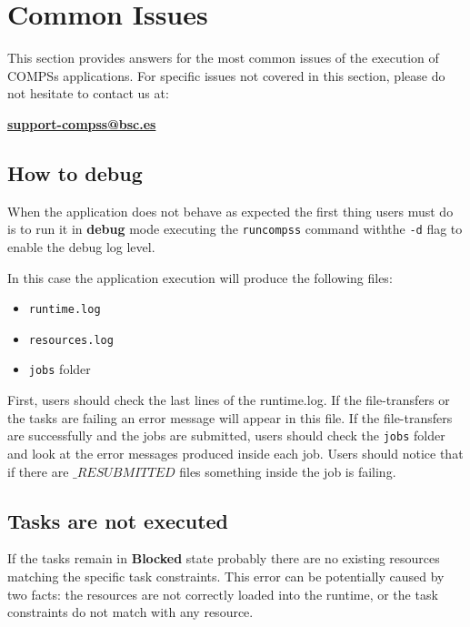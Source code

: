 \section{Common Issues}
\label{sec:Common_Issues}

This section provides answers for the most common issues of the execution of COMPSs applications.
For specific issues not covered in this section, please do not hesitate to contact us at:

\begin{center}
  \textbf{\url{support-compss@bsc.es}}
\end{center}


%
%
\subsection{How to debug}

When the application does not behave as expected the first thing users must do is to run it in \textbf{debug} mode executing
the \texttt{runcompss} command withthe \texttt{-d} flag to enable the debug log level.

In this case the application execution will produce the following files:

\begin{itemize}
 \item \texttt{runtime.log}
 \item \texttt{resources.log}
 \item \texttt{jobs} folder
\end{itemize}

First, users should check the last lines of the runtime.log. If the file-transfers or the tasks are failing an error message 
will appear in this file. If the file-transfers are successfully and the jobs are submitted, users should check the \texttt{jobs} folder and look 
at the error messages produced inside each job. Users should notice that if there are $\_RESUBMITTED$ files something 
inside the job is failing.


%
%
\subsection{Tasks are not executed}

If the tasks remain in \textbf{Blocked} state probably there are no existing resources matching the specific task constraints. 
This error can be potentially caused by two facts: the resources are not correctly loaded into the runtime, or the task constraints do not match with any resource. 

